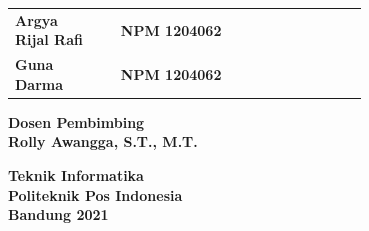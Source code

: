 \begin{flushleft}

  \sffamily\color{white}
  \begin{center}
    \vspace{30ex}
    \vspace{30ex}
  \end{center}

  \begin{adjustwidth}{-2mm}{}
    \begin{tabular}{lcp{0.7\linewidth}}
      \textbf{Argya Rijal Rafi} & & \textbf{NPM 1204062} \\
      \textbf{Guna Darma} & & \textbf{NPM 1204062} \\
    \end{tabular}
  \end{adjustwidth}
  \vspace{4ex}

  \noindent\textbf{Dosen Pembimbing} \\
  \textbf{Rolly Awangga, S.T., M.T.}
  \vspace{10ex}

  \textbf{Teknik Informatika} \\
  \textbf{Politeknik Pos Indonesia} \\
  \textbf{Bandung 2021}

\end{flushleft}

\restoregeometry
